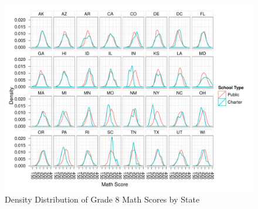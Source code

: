 \documentclass[letterpaper,12p,twoside]{article} %
\begin{document}
\begin{singlespace}
 \clearpage
 \clearpage
\begin{figure}[h]
\begin{center}
\includegraphics[height=\textwidth,angle=90]{../Figures/g8mathDensityByState.pdf}
\caption{Density Distribution of Grade 8 Math Scores by State}
\label{fig:g8math:density}
\end{center}
\end{figure}
\clearpage


\end{singlespace}
\end{document}
